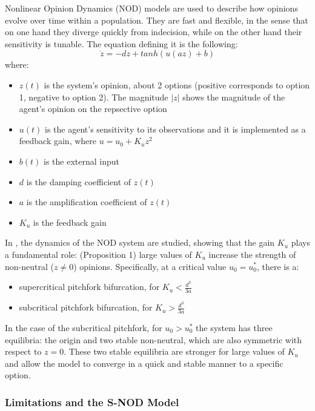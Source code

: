 \documentclass[12pt]{article}
\begin{document}
Nonlinear Opinion Dynamics (NOD) models are used to describe how opinions evolve over time within a population. They are fast and flexible, 
in the sense that on one hand they diverge quickly from indecision, while on the other hand their sensitivity is tunable. 
The equation defining it \cite{Cathcart2024} is the following:
\begin{equation}
    \dot{z} = -d z + tanh(u (a z) + b)
    \label{nod}
\end{equation}
where: 
\begin{itemize}
    \item $z(t)$ is the system's opinion, about 2 options (positive corresponds to option 1, negative to option 2). The magnitude $\lvert z \rvert$ 
    shows the magnitude of the agent's opinion on the repsective option
    \item $u(t)$ is the agent's sensitivity to its observations and it is implemented as a feedback gain, where $u = u_0 + K_u z^2$
    \item $b(t)$ is the external input
    \item $d$ is the damping coefficient of $z(t)$
    \item $a$ is the amplification coefficient of $z(t)$
    \item $K_u$ is the feedback gain
\end{itemize}

In \cite{Cathcart2024}, the dynamics of the NOD system are studied, showing that the gain $K_u$ plays a fundamental role: (Proposition 1)
large values of $K_u$ increase the strength of non-neutral ($z \neq 0$) opinions. Specifically, at a critical value $u_0 = u_0^{*}$, there is a: 
\begin{itemize}
    \item supercritical pitchfork bifurcation, for $K_u < \frac{d^3}{3a}$
    \item subcritical pitchfork bifurcation, for $K_u > \frac{d^3}{3a}$
\end{itemize}

In the case of the subcritical pitchfork, for $u_0 > u_0^{*}$ the system has three equilibria: the origin and two stable non-neutral, which are 
also symmetric with respect to $z = 0$. These two stable equilibria are stronger for large values of $K_u$ and allow the model 
to converge in a quick and stable manner to a specific option. 

\subsubsection*{Limitations and the S-NOD Model}
\end{document}
